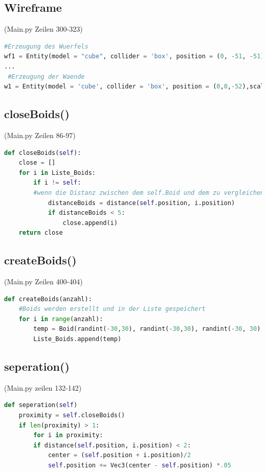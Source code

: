 \documentclass[a4paper, hidelinks, 12pt]{article}
\begin{document}
\subsection{Wireframe}(Main.py Zeilen 300-323)\label{CodeRaum}
\begin{lstlisting}[style=mystyle, language=Python]
 #Erzeugung des Wuerfels
wf1 = Entity(model = "cube", collider = 'box', position = (0, -51, -51), scale_x = 102)
...
 #Erzeugung der Waende
w1 = Entity(model = 'cube', collider = 'box', position = (0,0,-52),scale=(110,110,0), color = color.red, alpha = 0)
\end{lstlisting}
\subsection{closeBoids()}(Main.py Zeilen 86-97)\label{CodecloseBoids}
\begin{lstlisting}[style=mystyle, language=Python]
def closeBoids(self):
    close = []
    for i in Liste_Boids:
    	if i != self:
    	#wenn die Distanz zwischen dem self.Boid und dem zu vergleichenden Boid unter 5 liegt wird der vergleichende Boid in die Liste mit den Boids in der Naehe hinzugefuegt
		    distanceBoids = distance(self.position, i.position)
    		if distanceBoids < 5:
    			close.append(i)
    return close
\end{lstlisting}

\newpage
\subsection{createBoids()}(Main.py Zeilen 400-404)\label{CodecreateBoids}
\begin{lstlisting}[style=mystyle, language=Python]
def createBoids(anzahl):
	#Boids werden erstellt und in der Liste gespeichert
	for i in range(anzahl):
		temp = Boid(randint(-30,30), randint(-30,30), randint(-30, 30), randint(0,360), randint(0,360), randint(0,360), uniform(0.0, 100.0), uniform(0.0, 10.0), 300.0, 1, groesse)
		Liste_Boids.append(temp)
\end{lstlisting}
\subsection{seperation()} (Main.py zeilen 132-142)\label{Codeseperation}
\begin{lstlisting}[style=mystyle, language=Python]
def seperation(self)
	proximity = self.closeBoids()
	if len(proximity) > 1:
		for i in proximity:
		if distance(self.position, i.position) < 2:
			center = (self.position + i.position)/2
			self.position += Vec3(center - self.position) *.05
\end{lstlisting}
\end{document}
